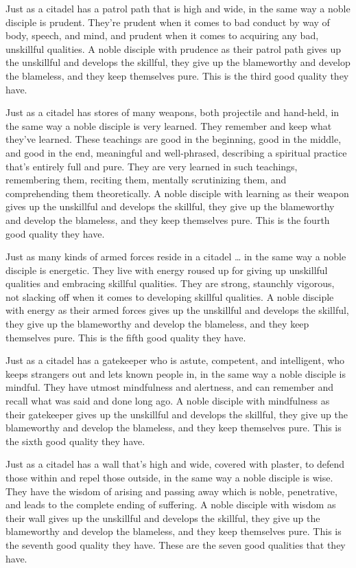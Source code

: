 \documentclass[12pt,openany]{book}%
\begin{document}
Just as a citadel has a patrol path that is high and wide, in the same way a noble disciple is prudent. They’re prudent when it comes to bad conduct by way of body, speech, and mind, and prudent when it comes to acquiring any bad, unskillful qualities. A noble disciple with prudence as their patrol path gives up the unskillful and develops the skillful, they give up the blameworthy and develop the blameless, and they keep themselves pure. This is the third good quality they have. 

Just as a citadel has stores of many weapons, both projectile and hand-held, in the same way a noble disciple is very learned. They remember and keep what they’ve learned. These teachings are good in the beginning, good in the middle, and good in the end, meaningful and well-phrased, describing a spiritual practice that’s entirely full and pure. They are very learned in such teachings, remembering them, reciting them, mentally scrutinizing them, and comprehending them theoretically. A noble disciple with learning as their weapon gives up the unskillful and develops the skillful, they give up the blameworthy and develop the blameless, and they keep themselves pure. This is the fourth good quality they have. 

Just as many kinds of armed forces reside in a citadel … in the same way a noble disciple is energetic. They live with energy roused up for giving up unskillful qualities and embracing skillful qualities. They are strong, staunchly vigorous, not slacking off when it comes to developing skillful qualities. A noble disciple with energy as their armed forces gives up the unskillful and develops the skillful, they give up the blameworthy and develop the blameless, and they keep themselves pure. This is the fifth good quality they have. 

Just as a citadel has a gatekeeper who is astute, competent, and intelligent, who keeps strangers out and lets known people in, in the same way a noble disciple is mindful. They have utmost mindfulness and alertness, and can remember and recall what was said and done long ago. A noble disciple with mindfulness as their gatekeeper gives up the unskillful and develops the skillful, they give up the blameworthy and develop the blameless, and they keep themselves pure. This is the sixth good quality they have. 

Just as a citadel has a wall that’s high and wide, covered with plaster, to defend those within and repel those outside, in the same way a noble disciple is wise. They have the wisdom of arising and passing away which is noble, penetrative, and leads to the complete ending of suffering. A noble disciple with wisdom as their wall gives up the unskillful and develops the skillful, they give up the blameworthy and develop the blameless, and they keep themselves pure. This is the seventh good quality they have. These are the seven good qualities that they have. 
\end{document}
